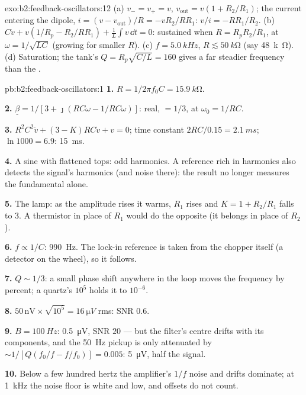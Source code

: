 \begin{solution}{exo:b2:feedback-oscillators:12}
(a) $v_- = v_+ = v$, $v_{\text{out}} = v(1 + R_2/R_1)$; the current entering the
dipole, $i = (v - v_{\text{out}})/R = -vR_2/RR_1$: $v/i = -RR_1/R_2$. (b) $C\dot v +
v(1/R_p - R_2/RR_1) + \frac1L\int v\,\dd t = 0$: sustained when $R = R_pR_2/R_1$,
at $\omega = 1/\sqrt{LC}$ (growing for smaller $R$). (c) $f = \qty{5.0}{kHz}$, $R \lesssim
\qty{50}{k\ohm}$ (say \qty{48}{k\ohm}). (d) Saturation; the tank's $Q = R_p
\sqrt{C/L} = 160$ gives a far steadier frequency than the .
\end{solution}

\begin{solution}{pb:b2:feedback-oscillators:1}
\textbf{1.} $R = 1/2\pi f_0C = \qty{15.9}{k\ohm}$.

\textbf{2.} $\underline\beta = 1/[3 + \jmath(RC\omega - 1/RC\omega)]$: real, $= 1/3$, at
$\omega_0 = 1/RC$.

\textbf{3.} $R^2C^2\ddot v + (3 - K)RC\dot v + v = 0$; time constant $2RC/0.15 =
\qty{2.1}{ms}$; $\ln1000 = 6.9$: \qty{15}{ms}.

\textbf{4.} A sine with flattened tops: odd harmonics. A reference rich
in harmonics also detects the signal's harmonics (and noise there):
the result no longer measures the fundamental alone.

\textbf{5.} The lamp: as the amplitude rises it warms, $R_1$ rises and
$K = 1 + R_2/R_1$ falls to $3$. A thermistor in place of $R_1$ would do
the opposite (it belongs in place of $R_2$).

\textbf{6.} $f \propto 1/C$: \qty{990}{Hz}. The lock-in reference is taken from
the chopper itself (a detector on the wheel), so it follows.

\textbf{7.} $Q \sim 1/3$: a small phase shift anywhere in the loop moves the
frequency by percent; a quartz's $10^5$ holds it to $10^{-6}$.

\textbf{8.} $50\,\text{nV} \times \sqrt{10^5} = \qty{16}{\micro V}$ rms: SNR $0.6$.

\textbf{9.} $B = \qty{100}{Hz}$: \qty{0.5}{\micro V}, SNR $20$ --- but the filter's
centre drifts with its components, and the \qty{50}{Hz} pickup is only
attenuated by $\sim 1/[Q(f_0/f - f/f_0)] = 0.005$: \qty{5}{\micro V}, half the
signal.

\textbf{10.} Below a few hundred hertz the amplifier's $1/f$ noise and
drifts dominate; at \qty{1}{kHz} the noise floor is white and low, and
offsets do not count.


\end{solution}
